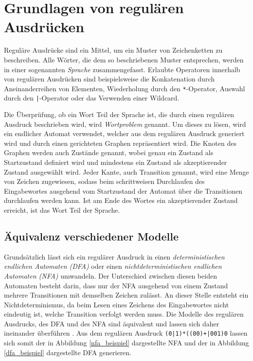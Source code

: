 \chapter{Grundlagen von regulären Ausdrücken}
\label{sec:regex}

Reguläre Ausdrücke sind ein Mittel, um ein Muster von Zeichenketten zu beschreiben.
Alle Wörter, die dem so beschriebenen Muster entsprechen, werden in einer sogenannten \emph{Sprache} zusammengefasst.
Erlaubte Operatoren innerhalb von regulären Ausdrücken sind beispielsweise die Konkatenation durch Aneinanderreihen von Elementen, Wiederholung durch den \texttt{*}-Operator, Auswahl durch den \texttt{|}-Operator oder das Verwenden einer Wildcard.

Die Überprüfung, ob ein Wort Teil der Sprache ist, die durch einen regulären Ausdruck beschrieben wird, wird \emph{Wortproblem} genannt.
Um dieses zu lösen, wird ein endlicher Automat verwendet, welcher aus dem regulären Ausdruck generiert wird und durch einen gerichteten Graphen repräsentiert wird.
Die Knoten des Graphen werden auch Zustände genannt, wobei genau ein Zustand als Startzustand definiert wird und mindestens ein Zustand als akzeptierender Zustand ausgewählt wird.
Jeder Kante, auch Transition genannt, wird eine Menge von Zeichen zugewiesen, sodass beim schrittweisen Durchlaufen des Eingabewortes ausgehend vom Startzustand der Automat über die Transitionen durchlaufen werden kann.
Ist am Ende des Wortes ein akzeptierender Zustand erreicht, ist das Wort Teil der Sprache.

\section{Äquivalenz verschiedener Modelle}

Grundsätzlich lässt sich ein regulärer Ausdruck in einen \emph{deterministischen endlichen Automaten (DFA)} oder einen \emph{nichtdeterministischen endlichen Automaten (NFA)} umwandeln.
Der Unterschied zwischen diesen beiden Automaten besteht darin, dass nur der NFA ausgehend von einem Zustand mehrere Transitionen mit demselben Zeichen zulässt.
An dieser Stelle entsteht ein Nichtdeterminismus, da beim Lesen eines Zeichens des Eingabewortes nicht eindeutig ist, welche Transition verfolgt werden muss.
Die Modelle des regulären Ausdrucks, des DFA und des NFA sind äquivalent und lassen sich daher ineinander überführen \cite{Hopcroft2002}.
Aus dem regulären Ausdruck \texttt{(0|1)*((00)+|001)0} lassen sich somit der in Abbildung \ref{nfa_beispiel} dargestellte NFA und der in Abbildung \ref{dfa_beispiel} dargestellte DFA generieren.

